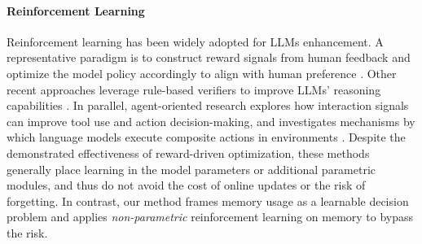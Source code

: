 \documentclass{article}
\theoremstyle{plain}
\theoremstyle{definition}
\theoremstyle{remark}
\begin{document}
\paragraph{Reinforcement Learning}

Reinforcement learning has been widely adopted for LLMs enhancement. A representative paradigm is to construct reward signals from human feedback and optimize the model policy accordingly to align with human preference  \citep{stiennon2020learning,ouyang2022training}. Other recent approaches leverage rule-based verifiers to improve LLMs' reasoning capabilities  \citep{guo2025deepseek,yu2025dapo}. In parallel, agent-oriented research explores how interaction signals can improve tool use and action decision-making, and investigates mechanisms by which language models execute composite actions in environments  \citep{schick2023toolformer}. Despite the demonstrated effectiveness of reward-driven optimization, these methods generally place learning in the model parameters or additional parametric modules, and thus do not avoid the cost of online updates or the risk of forgetting. In contrast, our method frames memory usage as a learnable decision problem and applies \emph{non-parametric} reinforcement learning on memory to bypass the risk.
\end{document}
